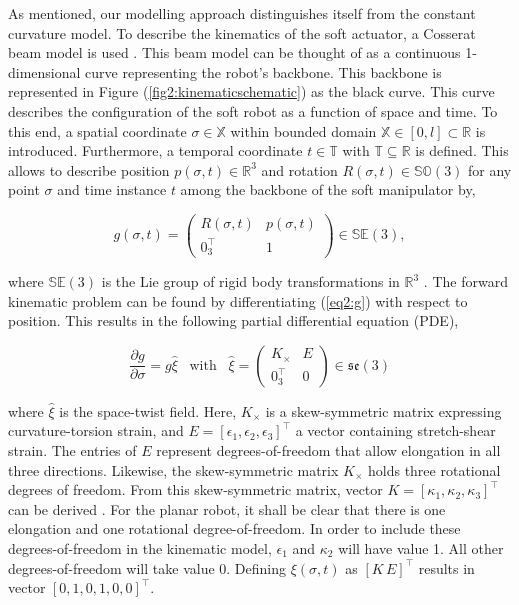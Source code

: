 As mentioned, our modelling approach distinguishes itself from the constant curvature model. To describe the kinematics of the soft actuator, a Cosserat beam model is used \cite{Boyer2019}. This beam model can be thought of as a continuous 1-dimensional curve representing the robot's backbone. This backbone is represented in Figure (\ref{fig2:kinematicschematic}) as the black curve. This curve describes the configuration of the soft robot as a function of space and time. To this end, a spatial coordinate  $\sigma \in \mathbb{X}$ within bounded domain $\mathbb{X} \in [0,l] \subset \mathbb{R}$ is introduced. Furthermore, a temporal coordinate $t \in  \mathbb{T}$ with $\mathbb{T} \subseteq \mathbb{R}$ is defined. This allows to describe position $p(\sigma,t) \in \mathbb{R}^3$ and rotation $R(\sigma,t) \in \mathbb{SO}(3)$ 
for any point $\sigma$ and time instance $t$ among the backbone of the soft manipulator by,


\begin{equation}
    g(\sigma,t) = \begin{pmatrix}  R(\sigma,t) & p(\sigma,t) \\ 0_3^\top & 1 \end{pmatrix} \in \mathbb{SE}(3),
    \label{eq2:g}
\end{equation}

where $\mathbb{SE}(3)$ is the Lie group of rigid body transformations in $\mathbb{R}^3$ \cite{Sola2018}. The forward kinematic problem can be found by differentiating (\ref{eq2:g}) with respect to position. This results in the following partial differential equation (PDE), 


\begin{equation}
    \frac{\partial g}{\partial \sigma} = g \hat{\xi} \hspace{10pt} \text{with} \hspace{10pt}  \hat{\xi} = \begin{pmatrix} K_\times & E \\ 0_3^\top & 0 \end{pmatrix} \in  \mathfrak{se}(3)
    \label{eq2:dgdsigma}
\end{equation}

where $\hat{\xi}$ is the space-twist field. Here, $K_\times$ is a skew-symmetric matrix expressing curvature-torsion strain, and $E = [\epsilon_1,\epsilon_2,\epsilon_3]^\top$ a vector containing stretch-shear strain. The entries of $E$ represent  degrees-of-freedom that allow elongation in all three directions. Likewise, the skew-symmetric matrix $K_{\times}$ holds three rotational degrees of freedom.  From this skew-symmetric matrix, vector $K = [\kappa_1,\kappa_2,\kappa_3]^\top$ can be derived \cite{Sola2018}. For the planar robot, it shall be clear that there is one elongation and one rotational degree-of-freedom. In order to include these degrees-of-freedom in the kinematic model, $\epsilon_1$ and $\kappa_2$ will have value 1. All other degrees-of-freedom will take value 0. Defining $\xi(\sigma,t)$ as $[K \hspace{2pt} E]^\top$ results in vector $[0,1,0,1,0,0]^\top$.

